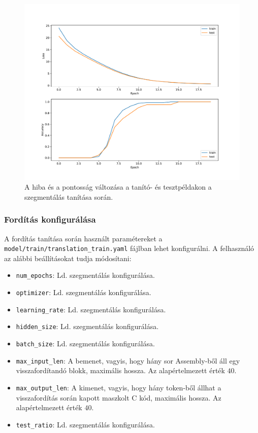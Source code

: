 \begin{figure}[H]
	\centering
    \captionsetup{singlelinecheck=off}
	\includegraphics[width=1\textwidth]{images/segmentation_train.pdf}
	\caption[A hiba és a pontosság változása a szegmentálás tanítása során.]%
    {A hiba és a pontosság változása a tanító- és tesztpéldakon a szegmentálás tanítása során.}
	\label{fig:plot1}
\end{figure}

\subsubsection{Fordítás konfigurálása}

A fordítás tanítása során használt paramétereket
a \texttt{model/train/translation\_train.yaml} fájlban lehet konfigurálni.
A felhasználó az alábbi beállításokat tudja módosítani:
\begin{itemize}
    \item \texttt{num\_epochs}: Ld. szegmentálás konfigurálása.
    \item \texttt{optimizer}: Ld. szegmentálás konfigurálása.
    \item \texttt{learning\_rate}: Ld. szegmentálás konfigurálása.
    \item \texttt{hidden\_size}: Ld. szegmentálás konfigurálása.
    \item \texttt{batch\_size}: Ld. szegmentálás konfigurálása.
    \item \texttt{max\_input\_len}: A bemenet, vagyis, hogy hány sor
        Assembly-ből áll egy visszafordítandó blokk, maximális hossza. Az
        alapértelmezett érték $40$.
    \item \texttt{max\_output\_len}: A kimenet, vagyis, hogy hány token-ből
        állhat a visszafordítás során kapott maszkolt C kód, maximális hossza.
        Az alapértelmezett érték $40$.
    \item \texttt{test\_ratio}: Ld. szegmentálás konfigurálása.
\end{itemize}

